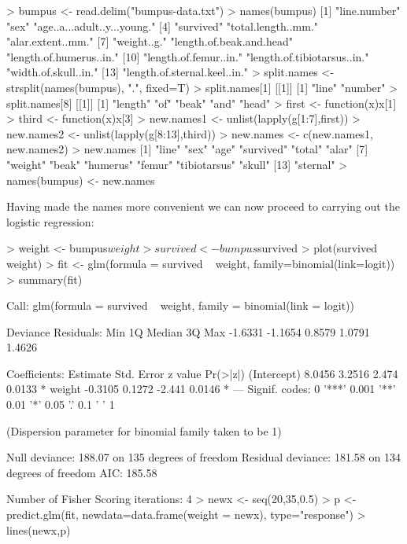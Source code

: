 \begin{R}
> bumpus <- read.delim("bumpus-data.txt")
> names(bumpus)
 [1] "line.number"                 "sex"                         "age..a...adult..y...young." 
 [4] "survived"                    "total.length..mm."           "alar.extent..mm."           
 [7] "weight..g."                  "length.of.beak.and.head"     "length.of.humerus..in."     
[10] "length.of.femur..in."        "length.of.tibiotarsus..in."  "width.of.skull..in."        
[13] "length.of.sternal.keel..in."
> split.names <- strsplit(names(bumpus), ".", fixed=T)
> split.names[1]
[[1]]
[1] "line"   "number"
> split.names[8]
[[1]]
[1] "length" "of"     "beak"   "and"    "head"  
> first <- function(x){x[1]}
> third <- function(x){x[3]}
> new.names1 <- unlist(lapply(g[1:7],first))
> new.names2 <- unlist(lapply(g[8:13],third))
> new.names <- c(new.names1, new.names2)
> new.names
 [1] "line"        "sex"         "age"         "survived"    "total"       "alar"       
 [7] "weight"      "beak"        "humerus"     "femur"       "tibiotarsus" "skull"      
[13] "sternal"   
> names(bumpus) <- new.names
\end{R}
Having made the names more convenient we can now proceed to carrying out
the logistic regression:

\begin{R}
> weight <- bumpus$weight
> survived <- bumpus$survived
> plot(survived ~ weight)
> fit <- glm(formula = survived ~ weight, family=binomial(link=logit))
> summary(fit)

Call:
glm(formula = survived ~ weight, family = binomial(link = logit))

Deviance Residuals: 
    Min       1Q   Median       3Q      Max  
-1.6331  -1.1654   0.8579   1.0791   1.4626  

Coefficients:
            Estimate Std. Error z value Pr(>|z|)  
(Intercept)   8.0456     3.2516   2.474   0.0133 *
weight       -0.3105     0.1272  -2.441   0.0146 *
---
Signif. codes:  0 '***' 0.001 '**' 0.01 '*' 0.05 '.' 0.1 ' ' 1 

(Dispersion parameter for binomial family taken to be 1)

    Null deviance: 188.07  on 135  degrees of freedom
Residual deviance: 181.58  on 134  degrees of freedom
AIC: 185.58

Number of Fisher Scoring iterations: 4
> newx <- seq(20,35,0.5)
> p <- predict.glm(fit, newdata=data.frame(weight = newx), type="response")
> lines(newx,p)
\end{R}

